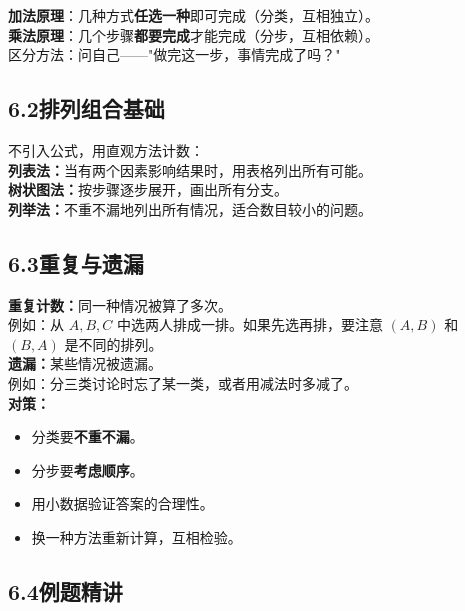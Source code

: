 \documentclass[12pt, a4paper]{ctexart}
\begin{document}
\begin{warnbox}
\textbf{加法原理}：几种方式\textbf{任选一种}即可完成（分类，互相独立）。\\
\textbf{乘法原理}：几个步骤\textbf{都要完成}才能完成（分步，互相依赖）。\\[4pt]
区分方法：问自己——"做完这一步，事情完成了吗？"
\end{warnbox}

\subsection*{6.2\quad 排列组合基础}

\begin{knowledgebox}
不引入公式，用直观方法计数：\\[4pt]
\textbf{列表法：}当有两个因素影响结果时，用表格列出所有可能。\\[4pt]
\textbf{树状图法：}按步骤逐步展开，画出所有分支。\\[4pt]
\textbf{列举法：}不重不漏地列出所有情况，适合数目较小的问题。
\end{knowledgebox}

\subsection*{6.3\quad 重复与遗漏}

\begin{warnbox}[计数中的常见错误]
\textbf{重复计数：}同一种情况被算了多次。\\
例如：从 $A,B,C$ 中选两人排成一排。如果先选再排，要注意 $(A,B)$ 和 $(B,A)$ 是不同的排列。\\[4pt]
\textbf{遗漏：}某些情况被遗漏。\\
例如：分三类讨论时忘了某一类，或者用减法时多减了。\\[4pt]
\textbf{对策：}
\begin{itemize}[itemsep=1pt]
  \item 分类要\textbf{不重不漏}。
  \item 分步要\textbf{考虑顺序}。
  \item 用小数据验证答案的合理性。
  \item 换一种方法重新计算，互相检验。
\end{itemize}
\end{warnbox}

\subsection*{6.4\quad 例题精讲}
\end{document}
